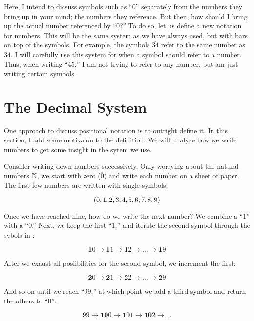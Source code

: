 \documentclass{article}
\begin{document}
	Here, I intend to dicsuss symbols such as ``0'' separately from the numbers they bring up in your mind; the numbers they reference. But then, how should I bring up the actual number referenced by ``0?'' To do so, let us define a new notation for numbers. This will be the same system as we have always used, but with bars on top of the symbols. For example, the symbols $\overline{34}$ refer to the same number as $34$. I will carefully use this system for when a symbol should refer to a number. Thus, when writing ``45,'' I am not trying to refer to any number, but am just writing certain symbols.
	
	\section{The Decimal System}
	One approach to discuss positional notation is to outright define it. In this section, I add some motivaion to the definition. We will analyze how we write numbers to get some insight in the sytem we use.
	
	Consider writing down numbers successively. Only worrying about the natural numbers $\mathbb{N}$, we start with zero ($\overline{0}$) and write each number on a sheet of paper. The first few numbers are written with single symbols:
	
	\begin{equation}\label{eq1}
		\pqty{0, 1, 2, 3, 4, 5, 6, 7, 8, 9}
	\end{equation}
	
	
	Once we have reached nine, how do we write the next number? We combine a ``1'' with a ``0.'' Next, we keep the first ``1,'' and iterate the second symbol through the sybols in :
	
	\begin{equation}\label{eq2}
		\bm{1}0\to \bm{1}1\to\bm{1}2\to\dots\to\bm{1}9
	\end{equation}
	
	After we exaust all posiibilities for the second symbol, we increment the first:
	
		\begin{equation}\label{eq3}
		\bm{2}0\to \bm{2}1\to\bm{2}2\to\dots\to\bm{2}9
		\end{equation}
	 
	And so on until we reach ``99,'' at which point we add a third symbol and return the others to ``0'':
	
		\begin{equation}\label{eq4}
		\bm{9}9\to\bm{10}0\to\bm{10}1\to\bm{10}2\to\dots
		\end{equation}
	 
\end{document}
